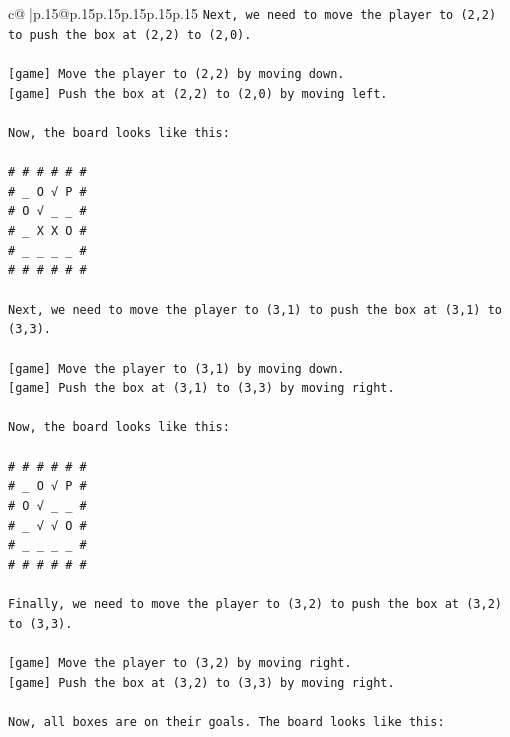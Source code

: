 \documentclass{article}
\begin{document}
{\begin{supertabular}{c@{$\;$}|p{.15\linewidth}@{}p{.15\linewidth}p{.15\linewidth}p{.15\linewidth}p{.15\linewidth}p{.15\linewidth}}
{{{\texttt{Next, we need to move the player to (2,2) to push the box at (2,2) to (2,0).} \\
\\ 
\texttt{{[}game{]} Move the player to (2,2) by moving down.} \\
\texttt{{[}game{]} Push the box at (2,2) to (2,0) by moving left.} \\
\\ 
\texttt{Now, the board looks like this:} \\
\\ 
\texttt{\# \# \# \# \# \#} \\
\texttt{\# \_ O √ P \#} \\
\texttt{\# O √ \_ \_ \#} \\
\texttt{\# \_ X X O \#} \\
\texttt{\# \_ \_ \_ \_ \#} \\
\texttt{\# \# \# \# \# \#} \\
\\ 
\texttt{Next, we need to move the player to (3,1) to push the box at (3,1) to (3,3).} \\
\\ 
\texttt{{[}game{]} Move the player to (3,1) by moving down.} \\
\texttt{{[}game{]} Push the box at (3,1) to (3,3) by moving right.} \\
\\ 
\texttt{Now, the board looks like this:} \\
\\ 
\texttt{\# \# \# \# \# \#} \\
\texttt{\# \_ O √ P \#} \\
\texttt{\# O √ \_ \_ \#} \\
\texttt{\# \_ √ √ O \#} \\
\texttt{\# \_ \_ \_ \_ \#} \\
\texttt{\# \# \# \# \# \#} \\
\\ 
\texttt{Finally, we need to move the player to (3,2) to push the box at (3,2) to (3,3).} \\
\\ 
\texttt{{[}game{]} Move the player to (3,2) by moving right.} \\
\texttt{{[}game{]} Push the box at (3,2) to (3,3) by moving right.} \\
\\ 
\texttt{Now, all boxes are on their goals. The board looks like this:} \\
\\ 
}}}
\end{supertabular}}
\end{document}

